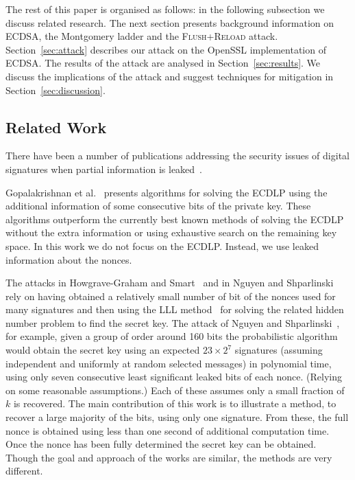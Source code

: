 \documentclass[twocolumn]{svjour3}
\newcommand{\fl}{\textsc{Flu\-sh+\allowbreak Re\-load}\xspace}
\newcommand{\myupcase}[1]{\uppercase{#1}}
\begin{document}
The rest of this paper is organised as follows: in the following subsection we discuss related research. The next section presents background information on \myupcase{ecdsa}, the Montgomery ladder and the \fl attack. %
Section~\ref{sec:attack} describes our attack on the OpenSSL implementation of \myupcase{ecdsa}.
The results of the attack are analysed in Section~\ref{sec:results}.
We discuss the implications of the attack and suggest techniques for mitigation in Section~\ref{sec:discussion}.

\subsection{Related Work}\label{sec:related}
There have been a number of publications addressing the security issues of digital signatures when partial information is leaked~\cite{Howgrave-GrahamS01,gopalakrishnan07solving,nguyen03insecurity}. 

Gopalakrishnan et al.~\cite{gopalakrishnan07solving} presents algorithms for solving the \myupcase{ecdlp} using the additional information of some consecutive bits of the private key. These algorithms outperform the currently best known methods of solving the \myupcase{ecdlp} without the extra information or using exhaustive search on the remaining key space. In this work we do not focus on the \myupcase{ecdlp}.
Instead, we use leaked information about the nonces. 

The attacks in Howgrave-Graham and Smart~\cite{Howgrave-GrahamS01} and in Nguyen and Shparlinski~\cite{nguyen03insecurity} 
rely on having obtained a relatively small number of bit of the nonces used for many signatures and then using the LLL method~\cite{LLL} for solving  
the related hidden number problem to find the secret key.
 The attack of Nguyen and Shparlinski~\cite{nguyen03insecurity}, for example, given a group of order around 160 bits the probabilistic algorithm would obtain the secret key using an expected $23\times 2^7$ signatures (assuming independent and uniformly at random selected messages) in polynomial time, using only seven consecutive least significant leaked bits of each nonce.
(Relying on some reasonable assumptions.) 
Each of these assumes only a small fraction of $k$ is recovered. The main contribution of this work is to illustrate a method, 
to recover a large majority of the bits, using only one signature.
From these, the full nonce is obtained using less than one second of additional computation time.
Once the nonce has been fully determined the secret key can be  obtained. 
Though the goal and approach of the works are similar, the methods are very different.
\end{document}
